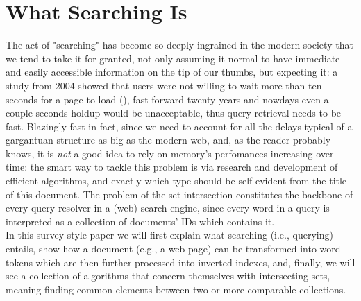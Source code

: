 \chapter{What Searching Is\label{intro}}

The act of "searching" has become so deeply ingrained in the modern society that we tend to take it for granted, not only assuming it normal to have immediate and easily accessible information on the tip of our thumbs, but expecting it: a study from 2004 showed that users were not willing to wait more than ten seconds for a page to load (\cite{waitTime}), fast forward twenty years and nowdays even a couple seconds holdup would be unacceptable, thus query retrieval needs to be fast. Blazingly fast in fact, since we need to account for all the delays typical of a gargantuan structure as big as the modern web, and, as the reader probably knows, it is \textit{not} a good idea to rely on memory's perfomances increasing over time: the smart way to tackle this problem is via research and development of efficient algorithms, and exactly which type should be self-evident from the title of this document. The problem of the set intersection constitutes the backbone of every query resolver in a (web) search engine, since every word in a query is interpreted as a collection of documents' IDs which contains it. \\
In this survey-style paper we will first explain what searching (i.e., querying) entails, show how a document (e.g., a web page) can be transformed into word tokens which are then further processed into inverted indexes, and, finally, we will see a collection of algorithms that concern themselves with intersecting sets, meaning finding common elements between two or more comparable collections. 
